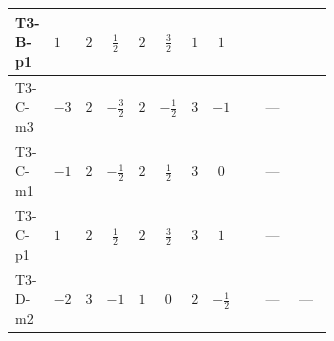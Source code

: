 \documentclass[8pt]{article}
\begin{document}
\begin{landscape}
\begin{longtable}{@{}llcccccc >{\raggedright\arraybackslash}p{0.21\linewidth} >{\raggedright\arraybackslash}p{0.21\linewidth} >{\raggedright\arraybackslash}p{0.21\linewidth}@{}}
T3-B-p1 & $1$ & $2$ & $\frac{1}{2}$ & $2$ & $\frac{3}{2}$ & $1$ & $1$ & \scriptsize\adjustbox{max width=\linewidth}{$\begin{gathered} +6 {\lambda_{HS_1}^{(1)}} {\lambda_{S_1}^{(1)}}\end{gathered}$} & \scriptsize\adjustbox{max width=\linewidth}{$\begin{gathered} {\lambda_{HS_1}^{(1)}} (2 T_{\nu}^{(1)}+6 \operatorname{Tr}\!\left({Y_d}\,\left({Y_d}\right)^{\dagger}\right)+2 \operatorname{Tr}\!\left({Y_e}\,\left({Y_e}\right)^{\dagger}\right)+6 \operatorname{Tr}\!\left({Y_u}\,\left({Y_u}\right)^{\dagger}\right))\end{gathered}$} & \scriptsize\adjustbox{max width=\linewidth}{$\begin{gathered} +\frac{9 {g_2}^4}{4}\end{gathered}$} \\
\midrule
T3-C-m3 & $-3$ & $2$ & $-\frac{3}{2}$ & $2$ & $-\frac{1}{2}$ & $3$ & $-1$ & \scriptsize\adjustbox{max width=\linewidth}{$\begin{gathered} +6 {\lambda_{HS_1}^{(1)}} {\lambda_{S_1}^{(1)}}\end{gathered}$} & --- & \scriptsize\adjustbox{max width=\linewidth}{$\begin{gathered} +\frac{9 {g_2}^4}{4}\end{gathered}$} \\
\midrule
T3-C-m1 & $-1$ & $2$ & $-\frac{1}{2}$ & $2$ & $\frac{1}{2}$ & $3$ & $0$ & \scriptsize\adjustbox{max width=\linewidth}{$\begin{gathered} +6 {\lambda_{HS_1}^{(1)}} {\lambda_{S_1}^{(1)}}\end{gathered}$} & --- & \scriptsize\adjustbox{max width=\linewidth}{$\begin{gathered} +\frac{9 {g_2}^4}{4}\end{gathered}$} \\
\midrule
T3-C-p1 & $1$ & $2$ & $\frac{1}{2}$ & $2$ & $\frac{3}{2}$ & $3$ & $1$ & \scriptsize\adjustbox{max width=\linewidth}{$\begin{gathered} +6 {\lambda_{HS_1}^{(1)}} {\lambda_{S_1}^{(1)}}\end{gathered}$} & --- & \scriptsize\adjustbox{max width=\linewidth}{$\begin{gathered} +\frac{9 {g_2}^4}{4}\end{gathered}$} \\
\midrule
T3-D-m2 & $-2$ & $3$ & $-1$ & $1$ & $0$ & $2$ & $-\frac{1}{2}$ & \scriptsize\adjustbox{max width=\linewidth}{$\begin{gathered} +8 {\lambda_{HS_1}^{(1)}} {\lambda_{S_1}^{(1)}}\end{gathered}$} & --- & --- \\

\end{longtable}
\end{landscape}
\end{document}
